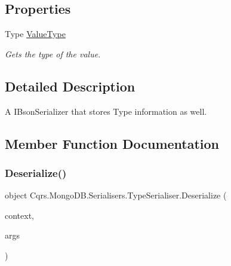\subsection*{Properties}
\begin{DoxyCompactItemize}
\item 
Type \hyperlink{classCqrs_1_1MongoDB_1_1Serialisers_1_1TypeSerialiser_af5d06e2fe995f816c840a8ceefd22991_af5d06e2fe995f816c840a8ceefd22991}{Value\+Type}
\begin{DoxyCompactList}\small\item\em Gets the type of the value. \end{DoxyCompactList}\end{DoxyCompactItemize}


\subsection{Detailed Description}
A I\+Bson\+Serializer that stores Type information as well. 



\subsection{Member Function Documentation}
\mbox{\label{classCqrs_1_1MongoDB_1_1Serialisers_1_1TypeSerialiser_a5e8aa7ae1372033da215d02b79947b20_a5e8aa7ae1372033da215d02b79947b20}} 
\subsubsection{\texorpdfstring{Deserialize()}{Deserialize()}}
{\footnotesize\ttfamily object Cqrs.\+Mongo\+D\+B.\+Serialisers.\+Type\+Serialiser.\+Deserialize (\begin{DoxyParamCaption}\item[{Bson\+Deserialization\+Context}]{context,  }\item[{Bson\+Deserialization\+Args}]{args }\end{DoxyParamCaption})}



